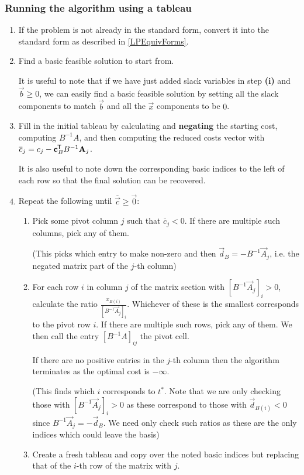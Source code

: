 \documentclass[../main.tex]{subfiles}
\begin{document}
\subsubsection{Running the algorithm using a tableau}
\begin{enumerate}
  \item If the problem is not already in the standard form, convert it into the standard form as described in \cref{LPEquivForms}.
  \item Find a basic feasible solution to start from.

    It is useful to note that if we have just added slack variables in step \textbf{(i)} and $\vec{b} \geq 0$, we can easily find a basic feasible solution by setting all the slack components to match $\vec{b}$ and all the $\vec{x}$ components to be $0$.
  \item Fill in the initial tableau by calculating and \textbf{negating} the starting cost, computing $B^{-1}A$, and then computing the reduced costs vector with $\overline{c}_j = c_j - \mathbf{\bm{c}}^{{\mkern-1.5mu\mathsf{T}}}_B B^{-1} \mathbf{\bm{A}}_j$.

    It is also useful to note down the corresponding basic indices to the left of each row so that the final solution can be recovered.
  \item Repeat the following until $\overline{\vec{c}} \geq \vec{0}$:
    \begin{enumerate}
      \item Pick some pivot column $j$ such that $\overline{c}_j < 0$.
        If there are multiple such columns, pick any of them.

        {\color{gray}(This picks which entry to make non-zero and then $\vec{d}_{B} = - B^{-1} \vec{A}_j$, i.e. the negated matrix part of the $j$-th column)}
      \item For each row $i$ in column $j$ of the matrix section with $[B^{-1} \vec{A}_j]_i > 0$, calculate the ratio $\frac{x_{B(i)}}{[B^{-1} \vec{A}_j]_i}$.
        Whichever of these is the smallest corresponds to the pivot row $i$.
        If there are multiple such rows, pick any of them.
        We then call the entry $[B^{-1} A]_{i j}$ the pivot cell.

        If there are no positive entries in the $j$-th column then the algorithm terminates as the optimal cost is $-\infty$.

        {\color{gray}(This finds which $i$ corresponds to $t^{*}$.
        Note that we are only checking those with $[B^{-1} \vec{A}_j]_i > 0$ as these correspond to those with $\vec{d}_{B(i)} < 0$ since $B^{-1} \vec{A}_j = - \vec{d}_B$.
        We need only check such ratios as these are the only indices which could leave the basis)}
      \item Create a fresh tableau and copy over the noted basic indices but replacing that of the $i$-th row of the matrix with $j$.


\end{enumerate}
\end{enumerate}
\end{document}
